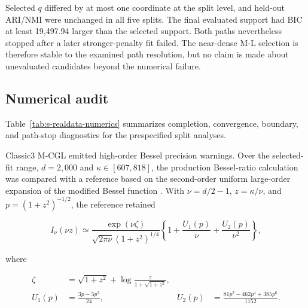 \documentclass[preprint,12pt,authoryear]{elsarticle}
\begin{document}
Selected $q$ differed by at most one coordinate at the split level, and
held-out ARI/NMI were unchanged in all five splits. The final evaluated
support had BIC at least 19,497.94 larger than the selected support. Both
paths nevertheless stopped after a later stronger-penalty fit failed. The
near-dense M-L selection is therefore stable to the examined path resolution,
but no claim is made about unevaluated candidates beyond the numerical
failure.

\subsection{Numerical audit}

Table~\ref{tab:s-realdata-numerics} summarizes completion, convergence,
boundary, and path-stop diagnostics for the prespecified split analyses.

\begin{table}[H]
\centering
\small
\caption{Convergence and boundary diagnostics for the methods included in the
final prespecified split-performance tables.}
\label{tab:s-realdata-numerics}
\end{table}

Classic3 M-CGL emitted high-order Bessel precision warnings. Over the
selected-fit range, $d=2{,}000$ and $\kappa\in[607,818]$, the production
Bessel-ratio calculation was compared with a reference based on the
second-order uniform large-order expansion of the modified Bessel function
\citep[Sec.~10.41]{olver2010nist}. With $\nu=d/2-1$, $z=\kappa/\nu$, and
$p={(1+z^2)}^{-1/2}$, the reference retained

\[
I_\nu(\nu z)
\simeq
\frac{\exp(\nu\zeta)}{\sqrt{2\pi\nu}{(1+z^2)}^{1/4}}
\left\{1+\frac{U_1(p)}{\nu}+\frac{U_2(p)}{\nu^2}\right\},
\]

where

\[
\begin{aligned}
\zeta
&=\sqrt{1+z^2}+\log\frac{z}{1+\sqrt{1+z^2}},\\
U_1(p)
&=\frac{3p-5p^3}{24},
&
U_2(p)
&=\frac{81p^2-462p^4+385p^6}{1152}.
\end{aligned}
\]
\end{document}
